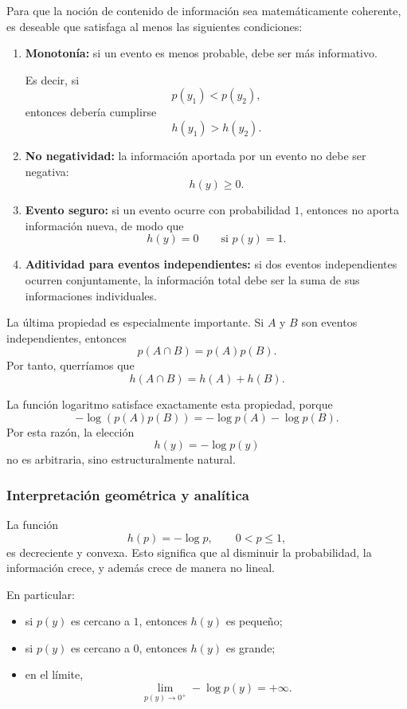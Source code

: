 \documentclass{article}
\begin{document}
Para que la noción de contenido de información sea matemáticamente coherente, es deseable que satisfaga al menos las siguientes condiciones:

\begin{enumerate}
\item \textbf{Monotonía:} si un evento es menos probable, debe ser más informativo.

Es decir, si
\[
p(y_1) < p(y_2),
\]
entonces debería cumplirse
\[
h(y_1) > h(y_2).
\]

\item \textbf{No negatividad:} la información aportada por un evento no debe ser negativa:
\[
h(y)\geq 0.
\]

\item \textbf{Evento seguro:} si un evento ocurre con probabilidad \(1\), entonces no aporta información nueva, de modo que
\[
h(y)=0 \qquad \text{si } p(y)=1.
\]

\item \textbf{Aditividad para eventos independientes:} si dos eventos independientes ocurren conjuntamente, la información total debe ser la suma de sus informaciones individuales.
\end{enumerate}

La última propiedad es especialmente importante. Si \(A\) y \(B\) son eventos independientes, entonces
\[
p(A\cap B)=p(A)p(B).
\]
Por tanto, querríamos que
\[
h(A\cap B)=h(A)+h(B).
\]

La función logaritmo satisface exactamente esta propiedad, porque
\[
-\log(p(A)p(B))=-\log p(A)-\log p(B).
\]
Por esta razón, la elección
\[
h(y)=-\log p(y)
\]
no es arbitraria, sino estructuralmente natural.

\subsubsection*{Interpretación geométrica y analítica}

La función
\[
h(p)=-\log p, \qquad 0<p\leq 1,
\]
es decreciente y convexa. Esto significa que al disminuir la probabilidad, la información crece, y además crece de manera no lineal.

En particular:

\begin{itemize}
\item si \(p(y)\) es cercano a \(1\), entonces \(h(y)\) es pequeño;
\item si \(p(y)\) es cercano a \(0\), entonces \(h(y)\) es grande;
\item en el límite,
\[
\lim_{p(y)\to 0^+} -\log p(y)=+\infty.
\]
\end{itemize}
\end{document}
